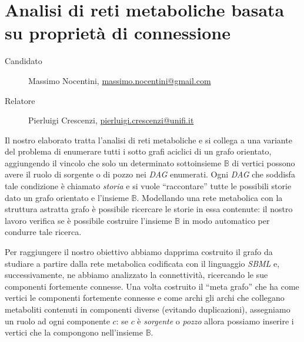 \documentclass[twoside,openright,titlepage,fleqn,
headinclude,11pt,a4paper,BCOR5mm,footinclude ]{scrbook}
\begin{document}
\frenchspacing
\raggedbottom
{}
\pagestyle{plain}
%
\pagestyle{scrheadings}

\lstset{
	language = java
	, numbers = left 
	, basicstyle=\sffamily%
	, tabsize=2
	, captionpos=b
	, breaklines=true
	, showspaces=false
	, showstringspaces=false
}

\chapter*{Analisi di reti metaboliche basata su propriet\`a di
  connessione}
\begin{description}
\item[Candidato] Massimo Nocentini, \url{massimo.nocentini@gmail.com}
\item[Relatore] Pierluigi Crescenzi, \url{pierluigi.crescenzi@unifi.it}
\end{description}
Il nostro elaborato tratta l'analisi di reti metaboliche e si collega
a una variante del problema di enumerare tutti i sotto grafi aciclici
di un grafo orientato, aggiungendo il vincolo che solo un determinato
sottoinsieme $\mathbb{B}$ di vertici possono avere il ruolo di
sorgente o di pozzo nei \emph{DAG} enumerati. Ogni \emph{DAG} che
soddisfa tale condizione \`e chiamato \emph{storia} e si vuole
``raccontare'' tutte le possibili storie dato un grafo orientato e
l'insieme $\mathbb{B}$. Modellando una rete metabolica con la
struttura astratta grafo \`e possibile ricercare le storie in essa
contenute: il nostro lavoro verifica se \`e possibile costruire
l'insieme $\mathbb{B}$ in modo automatico per condurre tale ricerca.

Per raggiungere il nostro obiettivo abbiamo dapprima costruito il
grafo da studiare a partire dalla rete metabolica codificata con il
linguaggio \emph{SBML} e, successivamente, ne abbiamo analizzato la
connettivit\`a, ricercando le sue componenti fortemente connesse. Una
volta costruito il ``meta grafo'' che ha come vertici le componenti
fortemente connesse e come archi gli archi che collegano metaboliti
contenuti in componenti diverse (evitando duplicazioni), assegniamo un
ruolo ad ogni componente $c$: se $c$ \`e \emph{sorgente} o
\emph{pozzo} allora possiamo inserire i vertici che la compongono
nell'insieme $\mathbb{B}$.
\end{document}
